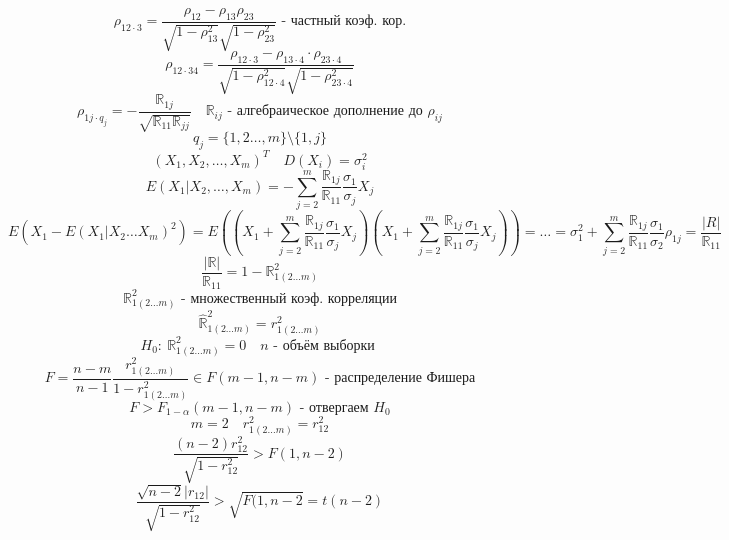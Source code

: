 \documentclass[a4paper]{article}
\begin{document}
\[
    \rho_{12 \cdot 3} = \frac{\rho_{12} - \rho_{13}\rho_{23}}{\sqrt{1-\rho_{13}^2} \sqrt{1 - \rho_{23}^2} }
    \text{ - частный коэф. кор.}
\]
\[
    \rho_{12 \cdot 34} = \frac{\rho_{12 \cdot 3} - \rho_{13 \cdot 4} \cdot \rho_{23 \cdot 4}}
    {\sqrt{1 - \rho_{12 \cdot 4}^2} \sqrt{1 - \rho_{23 \cdot 4}^2} } 
\]
\[
    \rho_{1j \cdot q_j} = - \frac{\mathbb{R}_{1j}}{\sqrt{\mathbb{R}_{11} \mathbb{R}_{jj}} } 
    \quad \mathbb{R}_{ij} \text{ - алгебраическое дополнение до } \rho_{ij}
\]
\[
    q_j = \{ 1, 2 \dots, m \} \setminus \{1, j\}
\]
\[
    (X_1, X_2, \dots, X_m)^{T} \quad D(X_i) = \sigma_i^2
\]
\[
    E(X_1 | X_2, \dots, X_m) = -\sum_{j=2}^{m} \frac{\mathbb{R}_{1j}}{\mathbb{R}_{11}} 
    \frac{\sigma_1}{\sigma_j} X_j
\]
\[
    E(X_1 - E(X_1 | X_2 \dots X_m)^2) =
    E\left((X_1 + \sum_{j=2}^{m} \frac{\mathbb{R}_{1j}}{\mathbb{R}_{11}} 
    \frac{\sigma_1}{\sigma_j} X_j)(X_1 + \sum_{j=2}^{m} \frac{\mathbb{R}_{1j}}{\mathbb{R}_{11}} 
    \frac{\sigma_1}{\sigma_j} X_j)\right) = \dots =
    \sigma_1^2 + \sum_{j=2}^{m} \frac{\mathbb{R}_{1j}}{\mathbb{R}_{11}} 
    \frac{\sigma_1}{\sigma_2}  \rho_{1j} = \frac{|R|}{\mathbb{R}_{11}} 
\]
\[
    \frac{|\mathbb{R}|}{\mathbb{R}_{11}} = 1 - \mathbb{R}_{1(2 \dots m)}^2
\]
\[
    \mathbb{R}_{1(2 \dots m)}^2 \text{ - множественный коэф. корреляции}
\]
\[
    \widehat{\mathbb{R}}_{1(2 \dots m)}^2 = r_{1(2 \dots m)}^2
\]
\[
    H_0: \  \mathbb{R}_{1(2 \dots m)}^2 = 0 \quad n \text{ - объём выборки }
\]
\[
    F = \frac{n - m}{n - 1}  \frac{r_{1(2 \dots m)}^2}{1 - r_{1(2 \dots m)}^2} 
    \in F(m - 1, n - m) \text{ - распределение Фишера}
\]
\[
    F > F_{1 - \alpha}(m - 1, n-m) \text{ - отвергаем } H_0
\]
\[
    m = 2 \quad r_{1(2 \dots m)}^2 = r_{12}^2
\]
\[
    \frac{(n-2) r_{12}^2}{\sqrt{1 - r_{12}^2} } > F(1, n-2)
\]
\[
    \frac{\sqrt{n-2} |r_{12}|}{\sqrt{1 - r_{12}^2} } > \sqrt{F(1, n-2} = t(n-2)
\]
\end{document}
